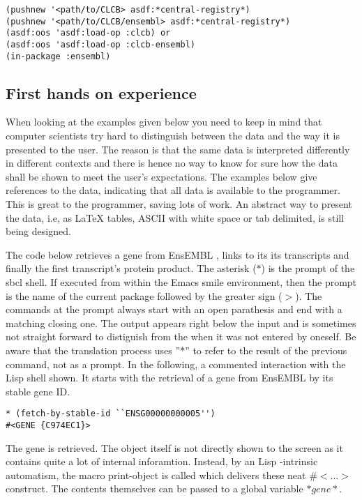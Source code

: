 \documentclass{book}
\newcommand\ensembl{EnsEMBL }
\newcommand\lisp{Lisp }
\begin{document}
\lstset{language=lisp}
\begin{lstlisting}
(pushnew '<path/to/CLCB> asdf:*central-registry*)
(pushnew '<path/to/CLCB/ensembl> asdf:*central-registry*)
(asdf:oos 'asdf:load-op :clcb) or
(asdf:oos 'asdf:load-op :clcb-ensembl)
(in-package :ensembl)
\end{lstlisting}

\subsection{First hands on experience}

When looking at the examples given below you need to keep in mind that
computer scientists try hard to distinguish between the data and the
way it is presented to the user. The reason is that the same data
is interpreted differently in different contexts and there is hence
no way to know for sure how the data shall be shown to meet the user's
expectations. The examples below give references to the data, indicating
that all data is available to the programmer. This is great to the
programmer, saving lots of work. An abstract way to present the data,
i.e, as LaTeX tables, ASCII with white space or tab delimited, is still
being designed.

The code below retrieves a gene from \ensembl \cite{BiAnCaChClCoCoCuCuCuDoDuFeFlGrHaHeHoHu06}, links to its its
transcripts and finally the first transcript's protein product. The
asterisk ($*$) is the prompt of the sbcl shell. If executed from within
the Emacs smile environment, then the prompt is the name of the current
package followed by the greater sign ($>$).  The commands at the prompt
always start with an open parathesis and end with a matching closing
one. The output appears right below the input and is sometimes not
straight forward to distiguish from the when it was not entered by
oneself.  Be aware that the translation process uses ''*'' to refer to
the result of the previous command, not as a prompt. In the following,
a commented interaction with the \lisp shell shown. It starts with the
retrieval of a gene from \ensembl by its stable gene ID.

\begin{lstlisting}
* (fetch-by-stable-id ``ENSG00000000005'')
#<GENE {C974EC1}>
\end{lstlisting}

The gene is retrieved. The object itself is not directly shown to the
screen as it contains quite a lot of internal inforamtion. Instead, by
an \lisp-intrinsic automatism, the macro print-object is called which
delivers these neat $\#<\ldots>$ construct. The contents themselves can
be passed to a global variable $*gene*$.
\end{document}
